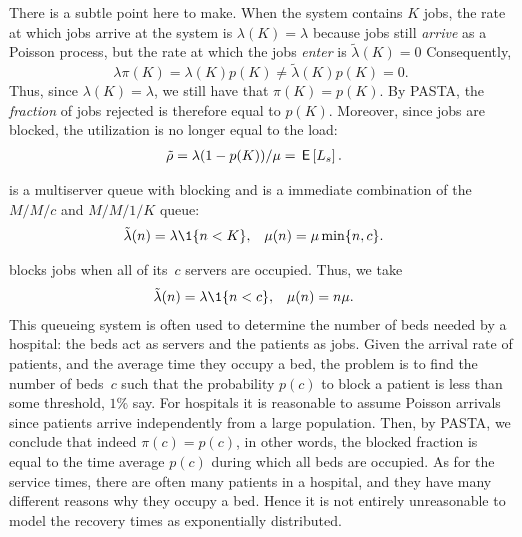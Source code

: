 \documentclass[stochastic-or.tex]{subfiles}
\begin{document}
There is a subtle point here to make.
When the system contains $K$ jobs, the rate at which jobs arrive at the system is $\lambda (K) = \lambda$ because jobs still \emph{arrive} as a Poisson process, but the rate at which the jobs \emph{enter} is $\tilde \lambda(K)= 0$ Consequently,
\begin{equation*}
\lambda \pi(K) = \lambda(K) p(K) \neq \tilde \lambda(K) p(K) = 0.
\end{equation*}
Thus, since $\lambda(K) = \lambda$,  we still have that $\pi(K) = p(K)$. By PASTA, the \emph{fraction} of jobs rejected is therefore equal to $p(K)$.
Moreover, since jobs are blocked, the utilization is no longer equal to the load:
\begin{align}\label{eq:mm1-2}
\tilde \rho &= \lambda (1-p(K))/\mu = \,\mathsf{E}\left[L_s\right].
\end{align}


 is a multiserver queue with blocking and is a immediate combination of the $M/M/c$ and $M/M/1/K$ queue:
\begin{align*}
\tilde \lambda(n) &= \lambda\1{n<K}, &\mu(n) &= \mu \min\{n, c\}.
\end{align*}

 blocks jobs when all of its~$c$ servers are occupied.
Thus, we take
\begin{align*}
\tilde \lambda(n) &= \lambda\1{n<c}, & \mu(n) &= n \mu.
 \end{align*}
This queueing system is often used to determine the number of beds needed by a hospital: the beds act as servers and the patients as jobs.
Given the arrival rate of patients, and the average time they occupy a bed, the problem is to find the number of beds~$c$ such that the probability $p(c)$ to block a patient is less than some threshold, $1\%$ say.
For hospitals it is reasonable to assume Poisson arrivals since patients arrive independently from a large population.
Then, by PASTA, we conclude that indeed $\pi(c) = p(c)$, in other words, the blocked fraction is equal to the time average $p(c)$ during which all beds are occupied.
As for the service times, there are often many patients in a hospital, and they have many different reasons why they occupy a bed.
Hence it is not entirely unreasonable to model the recovery times as exponentially distributed.
\end{document}
